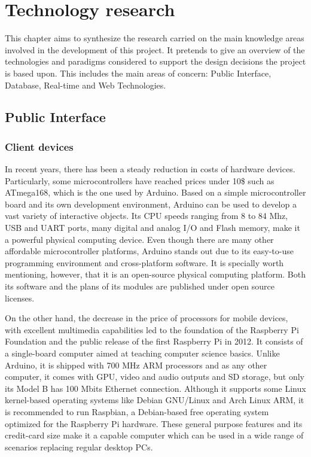 \chapter{Technology research}

This chapter aims to synthesize the research carried on the main knowledge areas involved in the development of this project. It pretends to give an overview of the technologies and paradigms considered to support the design decisions the project is based upon. This includes the main areas of concern: Public Interface, Database, Real-time and Web Technologies.

\section{Public Interface}

\subsection{Client devices}

In recent years, there has been a steady reduction in costs of hardware devices. Particularly, some microcontrollers have reached prices under 10\$ such as ATmega168, which is the one used by Arduino. Based on a simple microcontroller board and its own development environment, Arduino can be used to develop a vast variety of interactive objects. Its CPU speeds ranging from 8 to 84 Mhz, USB and UART ports, many digital and analog I/O and Flash memory, make it a powerful physical computing device. Even though there are many other affordable microcontroller platforms, Arduino stands out due to its easy-to-use programming environment and cross-platform software. It is specially worth mentioning, however, that it is an open-source physical computing platform. Both its software and the plans of its modules are published under open source licenses.

On the other hand, the decrease in the price of processors for mobile devices, with excellent multimedia capabilities led to the foundation of the Raspberry Pi Foundation and the public release of the first Raspberry Pi in 2012. It consists of a single-board computer aimed at teaching computer science basics. Unlike Arduino, it is shipped with 700 MHz ARM processors and as any other computer, it comes with GPU, video and audio outputs and SD storage, but only its Model B has 100 Mbits Ethernet connection. Although it supports some Linux kernel-based operating systems like Debian GNU/Linux and Arch Linux ARM, it is recommended to run Raspbian, a Debian-based free operating system optimized for the Raspberry Pi hardware. These general purpose features and its credit-card size make it a capable computer which can be used in a wide range of scenarios replacing regular desktop PCs.

